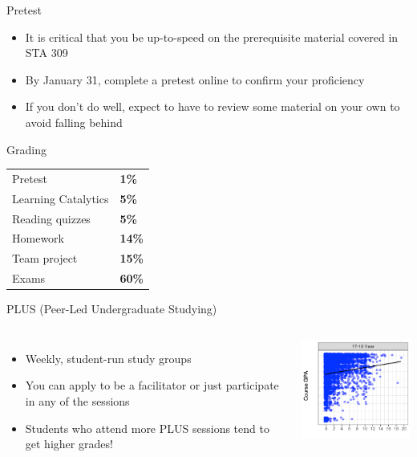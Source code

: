 \documentclass{beamer}\usepackage[]{graphicx}\usepackage[]{color}
\begin{document}
\begin{darkframes}
    \begin{frame}{Pretest}
      \begin{itemize}
        \item It is critical that you be up-to-speed on the prerequisite material covered in STA 309
        \item By January 31, complete a \alert{pretest} online to confirm your proficiency
        \item If you don't do well, expect to have to review some material on your own to avoid falling behind
      \end{itemize}
    \end{frame}

    \begin{frame}{Grading}
      \begin{center}
        \begin{tabular}{ll}
          Pretest             & \textbf{1\%}  \\
          Learning Catalytics & \textbf{5\%}  \\
          Reading quizzes     & \textbf{5\%}  \\
          Homework            & \textbf{14\%} \\
          Team project        & \textbf{15\%} \\
          Exams               & \textbf{60\%} \\
        \end{tabular}
      \end{center}
    \end{frame}

    \begin{frame}{PLUS (Peer-Led Undergraduate Studying)}
      \begin{columns}[onlytextwidth]
          \begin{itemize}
            \item Weekly, student-run study groups
            \item You can apply to be a facilitator or just participate in any of the sessions
            \item Students who attend more PLUS sessions tend to get higher grades!
          \end{itemize}
          \includegraphics[width=2in]{plus}
      \end{columns}
    \end{frame}


\end{darkframes}
\end{document}
